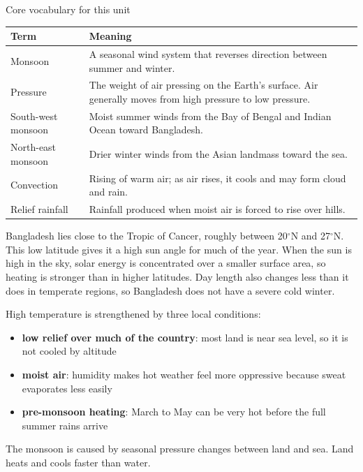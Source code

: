 \documentclass[11pt,a4paper]{article}
\begin{document}
\begin{keybox}{Core vocabulary for this unit}
\begin{tabularx}{\textwidth}{p{3.4cm}Y}
\toprule
\textbf{Term} & \textbf{Meaning}\\
\midrule
Monsoon & A seasonal wind system that reverses direction between summer and winter.\\
Pressure & The weight of air pressing on the Earth's surface. Air generally moves from high pressure to low pressure.\\
South-west monsoon & Moist summer winds from the Bay of Bengal and Indian Ocean toward Bangladesh.\\
North-east monsoon & Drier winter winds from the Asian landmass toward the sea.\\
Convection & Rising of warm air; as air rises, it cools and may form cloud and rain.\\
Relief rainfall & Rainfall produced when moist air is forced to rise over hills.\\
\bottomrule
\end{tabularx}
\end{keybox}

Bangladesh lies close to the Tropic of Cancer, roughly between 20$^\circ$N and 27$^\circ$N. This low latitude gives it a high sun angle for much of the year. When the sun is high in the sky, solar energy is concentrated over a smaller surface area, so heating is stronger than in higher latitudes. Day length also changes less than it does in temperate regions, so Bangladesh does not have a severe cold winter.

High temperature is strengthened by three local conditions:
\begin{itemize}
  \item \textbf{low relief over much of the country}: most land is near sea level, so it is not cooled by altitude
  \item \textbf{moist air}: humidity makes hot weather feel more oppressive because sweat evaporates less easily
  \item \textbf{pre-monsoon heating}: March to May can be very hot before the full summer rains arrive
\end{itemize}

The monsoon is caused by seasonal pressure changes between land and sea. Land heats and cools faster than water.

\MonsoonPressureDiagram
\end{document}
